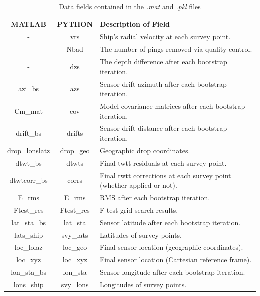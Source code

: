 \documentclass[titlepage, 12pt]{article}
\begin{document}
  \begin{table}[h!]
   \centering
   \caption{Data fields contained in the \textit{.mat} and \textit{.pkl} files}
   \label{table:dict}
   \begin{tabularx}{\linewidth}{|c|c|X|}
    \hline
    \textbf{MATLAB} & \textbf{PYTHON} & \textbf{Description of Field} \\ \hline
    -               & vrs        & Ship's radial velocity at each survey point. \\ \hline
    -               & Nbad       & The number of pings removed via quality control. \\ \hline
    -               & dzs        & The depth difference after each bootstrap iteration. \\ \hline
    azi\_bs         & azs        & Sensor drift azimuth after each bootstrap iteration. \\ \hline
    Cm\_mat         & cov        & Model covariance matrices after each bootstrap iteration. \\ \hline
    drift\_bs       & drifts     & Sensor drift distance after each bootstrap iteration. \\ \hline
    drop\_lonslatz  & drop\_geo  & Geographic drop coordinates. \\ \hline
    dtwt\_bs        & dtwts      & Final twtt residuals at each survey point. \\ \hline
    dtwtcorr\_bs    & corrs      & Final twtt corrections at each survey point (whether applied or not). \\ \hline
    E\_rms          & E\_rms     & RMS after each bootstrap iteration. \\ \hline
    Ftest\_res      & Ftest\_res & F-test grid search results. \\ \hline
    lat\_sta\_bs    & lat\_sta   & Sensor latitude after each bootstrap iteration. \\ \hline
    lats\_ship      & svy\_lats  & Latitudes of survey points. \\ \hline
    loc\_lolaz      & loc\_geo   & Final sensor location (geographic coordinates). \\ \hline
    loc\_xyz        & loc\_xyz   & Final sensor location (Cartesian reference frame). \\ \hline
    lon\_sta\_bs    & lon\_sta   & Sensor longitude after each bootstrap iteration. \\ \hline
    lons\_ship      & svy\_lons  & Longitudes of survey points. \\ \hline

\end{tabularx}
\end{table}
\end{document}
